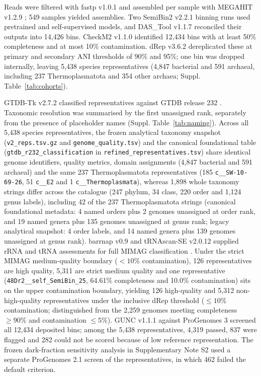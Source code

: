 \documentclass[11pt]{article}
\begin{document}
Reads were filtered with fastp v1.0.1 \citep{chen2018fastp} and assembled per sample with MEGAHIT v1.2.9 \citep{li2015megahit}; 549 samples yielded assemblies. Two SemiBin2 v2.2.1 binning runs \citep{pan2023semibin2} used pretrained and self-supervised models, and DAS\_Tool v1.1.7 \citep{sieber2018dastool} reconciled their outputs into 14,426 bins. CheckM2 v1.1.0 \citep{chklovski2023checkm2} identified 12,434 bins with at least 50\% completeness and at most 10\% contamination. dRep v3.6.2 \citep{olm2017drep} dereplicated these at primary and secondary ANI thresholds of 90\% and 95\%; one bin was dropped internally, leaving 5,438 species representatives (4,847 bacterial and 591 archaeal, including 237 Thermoplasmatota and 354 other archaea; Suppl. Table~\ref{tab:cohorts}).

GTDB-Tk v2.7.2 \citep{chaumeil2022gtdbtk} classified representatives against GTDB release 232 \citep{parks2022gtdb}. Taxonomic resolution was summarised by the first unassigned rank, separately from the presence of placeholder names (Suppl. Table~\ref{tab:naming}). Across all 5,438 species representatives, the frozen analytical taxonomy snapshot (\texttt{v2\_reps.tsv.gz} and \texttt{genome\_quality.tsv}) and the canonical foundational table (\texttt{gtdb\_r232\_classification} in \texttt{refined\_representatives.tsv}) share identical genome identifiers, quality metrics, domain assignments (4,847 bacterial and 591 archaeal) and the same 237 Thermoplasmatota representatives (185 \texttt{c\_\_SW-10-69-26}, 51 \texttt{c\_\_E2} and 1 \texttt{c\_\_Thermoplasmata}), whereas 1,898 whole taxonomy strings differ across the catalogue (247 phylum, 34 class, 220 order and 1,124 genus labels), including 42 of the 237 Thermoplasmatota strings (canonical foundational metadata: 4 named orders plus 2 genomes unassigned at order rank, and 19 named genera plus 135 genomes unassigned at genus rank; legacy analytical snapshot: 4 order labels, and 14 named genera plus 139 genomes unassigned at genus rank). barrnap v0.9 and tRNAscan-SE v2.0.12 \citep{chan2021trnascan} supplied rRNA and tRNA assessments for full MIMAG classification \citep{bowers2017mimag}. Under the strict MIMAG medium-quality boundary ($<10\%$ contamination), 126 representatives are high quality, 5,311 are strict medium quality and one representative (\texttt{48Dr2\_\_self\_SemiBin\_25}, 64.61\% completeness and 10.0\% contamination) sits on the upper contamination boundary, yielding 126 high-quality and 5,312 non-high-quality representatives under the inclusive dRep threshold ($\leq 10\%$ contamination; distinguished from the 2,259 genomes meeting completeness $\geq 90\%$ and contamination $\leq 5\%$). GUNC v1.1.1 \citep{orakov2021gunc} against ProGenomes 3 screened all 12,434 deposited bins; among the 5,438 representatives, 4,319 passed, 837 were flagged and 282 could not be scored because of low reference representation. The frozen dark-fraction sensitivity analysis in Supplementary Note S2 used a separate ProGenomes 2.1 screen of the representatives, in which 462 failed the default criterion.
\end{document}
